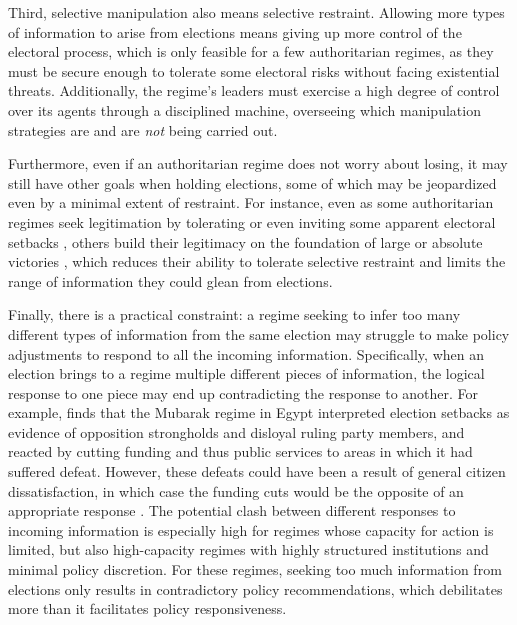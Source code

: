 \documentclass[12pt]{article}
\newcommand{\1}{\mathbbm{1}}
\begin{document}
Third, selective manipulation also means selective restraint. Allowing more types of information to arise from elections means giving up more control of the electoral process, which is only feasible for a few authoritarian regimes, as they must be secure enough to tolerate some electoral risks without facing existential threats. Additionally, the regime's leaders must exercise a high degree of control over its agents through a disciplined machine, overseeing which manipulation strategies are and are \textit{not} being carried out. %

Furthermore, even if an authoritarian regime does not worry about losing, it may still have other goals when holding elections, some of which may be jeopardized even by a minimal extent of restraint. For instance, even as some authoritarian regimes seek legitimation by tolerating or even inviting some apparent electoral setbacks \parencite{Morgenbesser2016}, others build their legitimacy on the foundation of large or absolute victories \parencite{Simpser2013}, which reduces their ability to tolerate selective restraint and limits the range of information they could glean from elections.

Finally, there is a practical constraint: a regime seeking to infer too many different types of information from the same election may struggle to make policy adjustments to respond to all the incoming information. Specifically, when an election brings to a regime multiple different pieces of information, the logical response to one piece may end up contradicting the response to another. For example, \citet{Blaydes2010} finds that the Mubarak regime in Egypt interpreted election setbacks as evidence of opposition strongholds and disloyal ruling party members, and reacted by cutting funding and thus public services to areas in which it had suffered defeat. However, these defeats could have been a result of general citizen dissatisfaction, in which case the funding cuts would be the opposite of an appropriate response \citep{Miller2015}. The potential clash between different responses to incoming information is especially high for regimes whose capacity for action is limited, but also high-capacity regimes with highly structured institutions and minimal policy discretion. For these regimes, seeking too much information from elections only results in contradictory policy recommendations, which debilitates more than it facilitates policy responsiveness.
\end{document}
